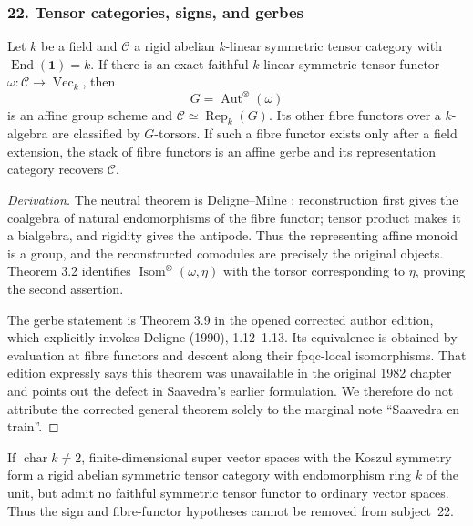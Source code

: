 \subsubsection{22. Tensor categories, signs, and gerbes}
\begin{theorem}\label{B:subject22}
Let $k$ be a field and $\mathcal C$ a rigid abelian $k$-linear symmetric tensor category with $\operatorname{End}(\mathbf1)=k$. If there is an exact faithful $k$-linear symmetric tensor functor $\omega:\mathcal C\to\operatorname{Vec}_k$, then
\[
 G=\operatorname{Aut}^{\otimes}(\omega)
\]
is an affine group scheme and $\mathcal C\simeq\operatorname{Rep}_k(G)$. Its other fibre functors over a $k$-algebra are classified by $G$-torsors. If such a fibre functor exists only after a field extension, the stack of fibre functors is an affine gerbe and its representation category recovers $\mathcal C$.
\end{theorem}
\begin{proof}[Derivation]
The neutral theorem is Deligne--Milne \cite[Theorem 2.11]{BDeligneMilne1982}: reconstruction first gives the coalgebra of natural endomorphisms of the fibre functor; tensor product makes it a bialgebra, and rigidity gives the antipode. Thus the representing affine monoid is a group, and the reconstructed comodules are precisely the original objects. Theorem 3.2 identifies $\operatorname{Isom}^{\otimes}(\omega,\eta)$ with the torsor corresponding to $\eta$, proving the second assertion.

The gerbe statement is Theorem 3.9 in the opened corrected author edition, which explicitly invokes Deligne (1990), 1.12--1.13. Its equivalence is obtained by evaluation at fibre functors and descent along their fpqc-local isomorphisms. That edition expressly says this theorem was unavailable in the original 1982 chapter and points out the defect in Saavedra's earlier formulation. We therefore do not attribute the corrected general theorem solely to the marginal note ``Saavedra en train''.
\end{proof}
\begin{proposition}\label{B:super}
If $\operatorname{char}k\ne2$, finite-dimensional super vector spaces with the Koszul symmetry form a rigid abelian symmetric tensor category with endomorphism ring $k$ of the unit, but admit no faithful symmetric tensor functor to ordinary vector spaces. Thus the sign and fibre-functor hypotheses cannot be removed from subject~22.
\end{proposition}
